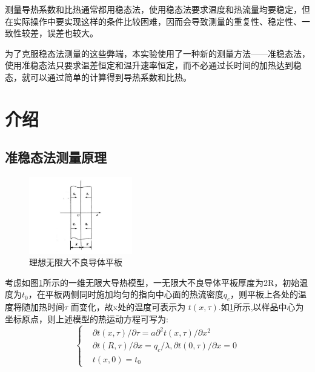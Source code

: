 \documentclass[10pt,a4paper,twocolumn,twoside,UTF8]{ctexart}
\begin{document}
测量导热系数和比热通常都用稳态法，使用稳态法要求温度和热流量均要稳定，但在实际操作中要实现这样的条件比较困难，因而会导致测量的重复性、稳定性、一致性较差，误差也较大。

为了克服稳态法测量的这些弊端，本实验使用了一种新的测量方法——准稳态法，使用准稳态法只要求温差恒定和温升速率恒定，而不必通过长时间的加热达到稳态，就可以通过简单的计算得到导热系数和比热。
\newpage

\section{介\quad 绍}
    \subsection{准稳态法测量原理}
	\begin{figure}[!h]
		\centering
		\includegraphics[width=0.4\textwidth]{img//1.jpg}
		\caption{理想无限大不良导体平板}
		\label{fig:1}
	\end{figure}

	考虑如图\ref*{fig:1}所示的一维无限大导热模型，一无限大不良导体平板厚度为2R，初始温度为$t_0$，在平板两侧同时施加均匀的指向中心面的热流密度$q_c$，则平板上各处的温度将随加热时间$\tau$ 而变化，故x处的温度可表示为 $t ( x , \tau )$.如\ref*{fig:1}所示,以样品中心为坐标原点，则上述模型的热运动方程可写为: 
	\[\left\{%
	\begin{aligned}
	&\partial t ( x , \tau )/\partial \tau=a\partial ^2 t ( x , \tau )/\partial x^2\\
	&\partial t ( R , \tau )/\partial x=q_c/\lambda, \partial t ( 0 , \tau )/\partial x =0\\
	&t(x,0)=t_0
	\end{aligned}
	\right.
	\]
	
\end{document}
